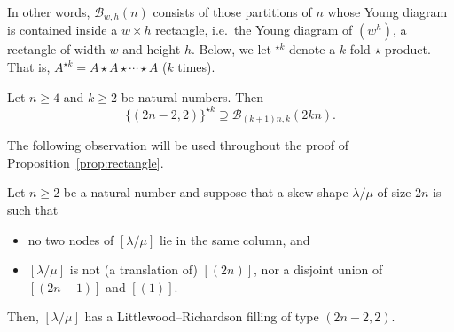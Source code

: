 \documentclass[ALCO, Unicode]{cedram}
\newcommand{\cB}{\mathcal{B}}
\begin{document}
In other words, $\cB_{w,h}(n)$ consists of those partitions of $n$ whose Young diagram is contained inside a $w\times h$ rectangle, i.e.~the Young diagram of $(w^h)$, a rectangle of width $w$ and height $h$. Below, we let ${}^{\star k}$ denote a $k$-fold $\star$-product. That is, $A^{\star k} = A\star A\star \cdots \star A$ ($k$ times).

\begin{proposition}\label{prop:rectangle}
	Let $n\ge 4$ and $k\ge 2$ be natural numbers. Then
	\[ \{(2n-2,2)\}^{\star k} \supseteq \cB_{(k+1)n,k}(2kn). \]
\end{proposition}

The following observation will be used throughout the proof of Proposition~\ref{prop:rectangle}.

\begin{lemma}\label{lem:skew}
	Let $n\ge 2$ be a natural number and suppose that a skew shape $\lambda/\mu$ of size $2n$ is such that
	\begin{itemize}
		\item no two nodes of $[\lambda/\mu]$ lie in the same column, and
		\item $[\lambda/\mu]$ is not \textup{(}a translation of\textup{)} $[(2n)]$, nor a disjoint union of $[(2n-1)]$ and $[(1)]$.
	\end{itemize}
	Then, $[\lambda/\mu]$ has a Littlewood--Richardson filling of type $(2n-2,2)$.
\end{lemma}
\end{document}
